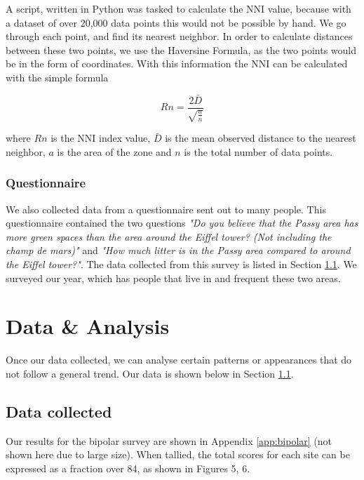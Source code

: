 \documentclass[11pt,letterpaper]{article}
\begin{document}
A script, written in Python was tasked to calculate the NNI value, because with a dataset of over 20,000 data points this would not be possible by hand. We go through each point, and find its nearest neighbor. In order to calculate distances between these two points, we use the Haversine Formula, as the two points would be in the form of coordinates. With this information the NNI can be calculated with the simple formula

$$Rn = \frac{2 \bar D}{\sqrt{\frac{a}{n}}}$$

where $Rn$ is the NNI index value, $\bar D$ is the mean observed distance to the nearest neighbor, $a$ is the area of the zone and $n$ is the total number of data points.

\subsubsection{Questionnaire}
\label{sec:questionnaire}

We also collected data from a questionnaire sent out to many people. This questionnaire contained the two questions \textit{"Do you believe that the Passy area has more green spaces than the area around the Eiffel tower? (Not including the champ de mars)"} and \textit{"How much litter is in the Passy area compared to around the Eiffel tower?"}. The data collected from this survey is listed in Section \ref{sec:data}. We surveyed our year, which has people that live in  and frequent these two areas.


\section{Data \& Analysis}
\label{sec:analysis}

Once our data collected, we can analyse certain patterns or appearances that do not follow a general trend. Our data is shown below in Section \ref{sec:data}.

\subsection{Data collected}
\label{sec:data}

Our results for the bipolar survey are shown in Appendix \ref{app:bipolar} (not shown here due to large size). When tallied, the total scores for each site can be expressed as a fraction over 84, as shown in Figures 5, 6.
\end{document}
